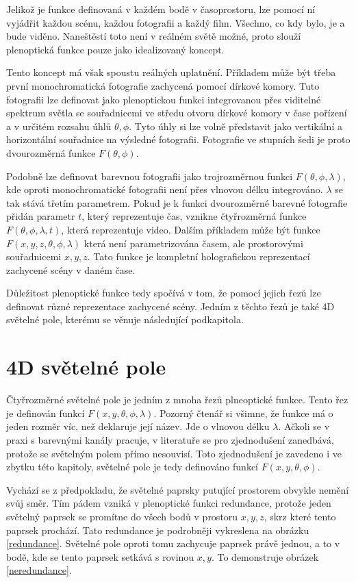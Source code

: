 Jelikož je funkce definovaná v každém bodě v časoprostoru, lze pomocí ní vyjádřit každou scénu, každou fotografii a každý film.
Všechno, co kdy bylo, je a bude viděno.
Naneštěstí toto není v reálném světě možné, proto slouží plenoptická funkce pouze jako idealizovaný koncept.

Tento koncept má však spoustu reálných uplatnění. Příkladem může být třeba první monochromatická fotografie zachycená pomocí dírkové komory.
Tuto fotografii lze definovat jako plenoptickou funkci integrovanou přes viditelné spektrum světla se souřadnicemi ve středu otvoru dírkové komory v čase pořízení a v určitém rozsahu úhlů $\theta, \phi$.
Tyto úhly si lze volně představit jako vertikální a horizontální souřadnice na výsledné fotografii.
Fotografie ve stupních šedi je proto dvourozměrná funkce $F(\theta, \phi)$.

Podobně lze definovat barevnou fotografii jako trojrozměrnou funkci $F(\theta, \phi, \lambda)$, kde oproti monochromatické fotografii není přes vlnovou délku integrováno.
$\lambda$ se tak stává třetím parametrem.
Pokud je k funkci dvourozměrné barevné fotografie přidán parametr $t$, který reprezentuje čas, vznikne čtyřrozměrná funkce $F(\theta, \phi, \lambda, t)$, která reprezentuje video.
Dalším příkladem může být funkce $F(x, y, z, \theta, \phi, \lambda)$ která není parametrizována časem, ale prostorovými souřadnicemi $x, y, z$.
Tato funkce je kompletní holografickou reprezentací zachycené scény v daném čase.

Důležitost plenoptické funkce tedy spočívá v tom, že pomocí jejich řezů lze definovat různé reprezentace zachycené scény.
Jedním z těchto řezů je také 4D světelné pole, kterému se věnuje následující podkapitola.

\section{4D světelné pole}
\label{4D-light-field}
Čtyřrozměrné světelné pole je jedním z mnoha řezů plneoptické funkce.
Tento řez je definován funkcí $F(x, y, \theta, \phi, \lambda)$.
Pozorný čtenář si všimne, že funkce má o jeden rozměr víc, než deklaruje její název.
Jde o vlnovou délku $\lambda$.
Ačkoli se v praxi s barevnými kanály pracuje, v literatuře se pro zjednodušení zanedbává, protože se světelným polem přímo nesouvisí.
Toto zjednodušení je zavedeno i ve zbytku této kapitoly, světelné pole je tedy definováno funkcí $F(x, y, \theta, \phi)$.

Vychází se z předpokladu, že světelné paprsky putující prostorem obvykle nemění svůj směr.
Tím pádem vzniká v plenoptické funkci redundance, protože jeden světelný paprsek se promítne do všech bodů v prostoru $x, y, z$, skrz které tento paprsek prochází.
Tato redundance je podrobněji vykreslena na obrázku \ref{redundance}.
Světelné pole oproti tomu zachycuje paprsek právě jednou, a to v bodě, kde se tento paprsek setkává s rovinou $x, y$.
To demonstruje obrázek \ref{neredundance}.

